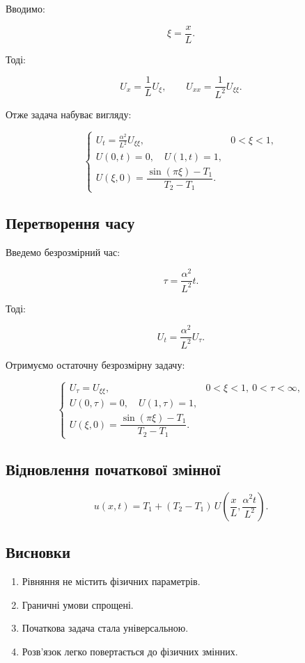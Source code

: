 \documentclass[
  ukrainian,
]{article}
\providecommand{\tightlist}{%
  \setlength{\itemsep}{0pt}\setlength{\parskip}{0pt}}
\begin{document}
Вводимо:

\[
\xi = \frac{x}{L}.
\]

Тоді:

\[
U_x = \frac{1}{L} U_\xi, \qquad U_{xx} = \frac{1}{L^2} U_{\xi\xi}.
\]

Отже задача набуває вигляду:

\[
\begin{cases}
U_t = \frac{\alpha^2}{L^2} U_{\xi\xi}, & 0 < \xi < 1, \\
U(0,t)=0,\quad U(1,t)=1, \\
U(\xi,0)=\dfrac{\sin(\pi \xi)-T_1}{T_2-T_1}.
\end{cases}
\]

\subsection{Перетворення
часу}\label{ux43fux435ux440ux435ux442ux432ux43eux440ux435ux43dux43dux44f-ux447ux430ux441ux443}

Введемо безрозмірний час:

\[
\tau = \frac{\alpha^2}{L^2} t.
\]

Тоді:

\[
U_t = \frac{\alpha^2}{L^2} U_\tau.
\]

Отримуємо остаточну безрозмірну задачу:

\[
\begin{cases}
U_\tau = U_{\xi\xi}, & 0 < \xi < 1,\ 0 < \tau < \infty, \\
U(0,\tau)=0,\quad U(1,\tau)=1, \\
U(\xi,0)=\dfrac{\sin(\pi \xi)-T_1}{T_2-T_1}.
\end{cases}
\]

\subsection{Відновлення початкової
змінної}\label{ux432ux456ux434ux43dux43eux432ux43bux435ux43dux43dux44f-ux43fux43eux447ux430ux442ux43aux43eux432ux43eux457-ux437ux43cux456ux43dux43dux43eux457}

\[
u(x,t) = T_1 + (T_2 - T_1)\, U\!\left(\frac{x}{L}, \frac{\alpha^2 t}{L^2}\right).
\]

\subsection{Висновки}\label{ux432ux438ux441ux43dux43eux432ux43aux438}

\begin{enumerate}
\def\labelenumi{\arabic{enumi}.}
\tightlist
\item
  Рівняння не містить фізичних параметрів.
\item
  Граничні умови спрощені.
\item
  Початкова задача стала універсальною.
\item
  Розв'язок легко повертається до фізичних змінних.
\end{enumerate}
\end{document}
